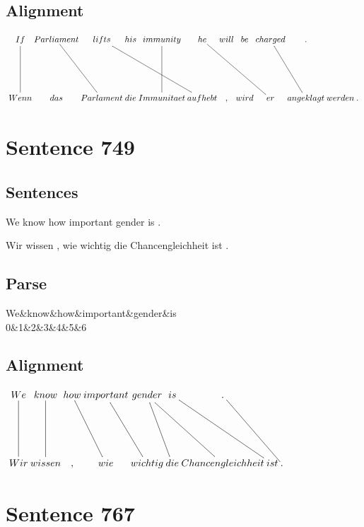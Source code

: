 \documentclass{report}
\begin{document}
\subsection*{Alignment}
\scriptsize{
$
\xymatrix@C-2.3pc{
If \ar @{-} [dd] & Parliament \ar @{-} [ddr] & lifts \ar @{-} [ddrrr] & his & immunity \ar @{-} [dd] & he \ar @{-} [ddrrr] & will & be & charged \ar @{-} [ddr] & .\\\\
Wenn & das & Parlament & die & Immunitaet & aufhebt & , & wird & er & angeklagt & werden & .
}$}
\newpage\section*{Sentence 749}

\subsection*{Sentences}
We know how important gender is .

\noindent Wir wissen , wie wichtig die Chancengleichheit ist .



\subsection*{Parse}
\begin{dependency}[theme=simple]
\begin{deptext}[column sep=.5cm, row sep=.1ex]
We\&know\&how\&important\&gender\&is\\
0\&1\&2\&3\&4\&5\&6\\
\end{deptext}
\end{dependency}


\subsection*{Alignment}
\scriptsize{
$
\xymatrix@C-2.3pc{
We \ar @{-} [dd] & know \ar @{-} [dd] & how \ar @{-} [ddr] & important \ar @{-} [ddr] & gender \ar @{-} [ddrr] \ar @{-} [ddr] & is \ar @{-} [ddrr] & . \ar @{-} [ddrr]\\\\
Wir & wissen & , & wie & wichtig & die & Chancengleichheit & ist & .
}$}
\newpage\section*{Sentence 767}
\end{document}
